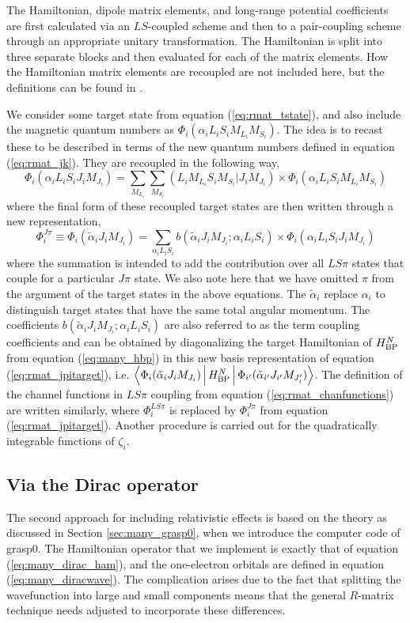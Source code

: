 The Hamiltonian, dipole matrix elements, and long-range potential coefficients are first calculated via an $LS$-coupled scheme and then to a pair-coupling scheme through an appropriate unitary transformation. The Hamiltonian is split into three separate blocks and then evaluated for each of the matrix elements. How the Hamiltonian matrix elements are recoupled are not included here, but the definitions can be found in \citet{1982CoPhC..25..347S}.

We consider some target state from equation (\ref{eq:rmat_tstate}), and also include the magnetic quantum numbers as $\Phi_i(\alpha_iL_iS_iM_{L_i}M_{S_i})$. The idea is to recast these to be described in terms of the new quantum numbers defined in equation (\ref{eq:rmat_jk}). They are recoupled in the following way,
\[
\Phi_i(\alpha_iL_iS_iJ_iM_{J_i}) = \sum_{M_{L_i}}\sum_{M_{S_i}}(L_iM_{L_i}S_iM_{S_i} | J_iM_{J_i})\times\Phi_i(\alpha_iL_iS_iM_{L_i}M_{S_i})
\]
where the final form of these recoupled target states are then written through a new representation,
\begin{equation}\label{eq:rmat_jpitarget}
\Phi_i^{J\pi}\equiv \Phi_i(\tilde{\alpha}_iJ_iM_{J_i}) = \sum_{\alpha_iL_iS_i}b(\tilde{\alpha}_iJ_iM_{J_i};\alpha_iL_iS_i)\times\Phi_i(\alpha_iL_iS_iJ_iM_{J_i}) 
\end{equation}
where the summation is intended to add the contribution over all $LS\pi$ states that couple for a particular $J\pi$ state. We also note here that we have omitted $\pi$ from the argument of the target states in the above equations. The $\tilde{\alpha}_i$ replace $\alpha_i$ to distinguish target states that have the same total angular momentum. The coefficients $b(\tilde{\alpha}_iJ_iM_{J_i};\alpha_iL_iS_i)$ are also referred to as the term coupling coefficients and can be obtained by diagonalizing the target Hamiltonian of $H^{N}_{{\rm BP}}$ from equation (\ref{eq:many_hbp}) in this new basis representation of equation (\ref{eq:rmat_jpitarget}), i.e. $\Braket{\Phi_i(\tilde{\alpha}_iJ_iM_{J_i}) | H^N_{{\rm BP}} | \Phi_{i'}(\tilde{\alpha}_{i'}J_{i'}M_{J_i'})}$. The definition of the channel functions in $LS\pi$ coupling from equation (\ref{eq:rmat_chanfunctions}) are written similarly, where $\Phi_i^{LS\pi}$ is replaced by $\Phi_i^{J\pi}$ from equation (\ref{eq:rmat_jpitarget}). Another procedure is carried out for the quadratically integrable functions of $\zeta_i$.

\subsection{Via the Dirac operator}
The second approach for including relativistic effects is based on the theory as discussed in Section \ref{sec:many_grasp0}, when we introduce the computer code of {\sc grasp0}. The Hamiltonian operator that we implement is exactly that of equation (\ref{eq:many_dirac_ham}), and the one-electron orbitals are defined in equation (\ref{eq:many_diracwave}). The complication arises due to the fact that splitting the wavefunction into large and small components means that the general $R$-matrix technique needs adjusted to incorporate these differences.

